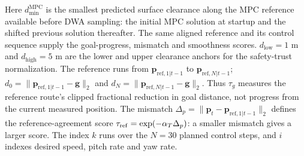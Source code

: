 \documentclass[10pt]{article}
\begin{document}
Here $d_{\min}^{\mathrm{MPC}}$ is the smallest predicted surface clearance along the MPC reference available before DWA sampling: the initial MPC solution at startup and the shifted previous solution thereafter. The same aligned reference and its control sequence supply the goal-progress, mismatch and smoothness scores. $d_{\mathrm{low}}=1$ m and $d_{\mathrm{high}}=5$ m are the lower and upper clearance anchors for the safety-trust normalization. The reference runs from $\mathbf p_{\mathrm{ref},1|t-1}$ to $\mathbf p_{\mathrm{ref},N|t-1}$; $d_0=\|\mathbf p_{\mathrm{ref},1|t-1}-\mathbf g\|_2$ and $d_N=\|\mathbf p_{\mathrm{ref},N|t-1}-\mathbf g\|_2$. Thus $\tau_g$ measures the reference route's clipped fractional reduction in goal distance, not progress from the current measured position. The mismatch $\Delta_p=\|\mathbf p_t-\mathbf p_{\mathrm{ref},1|t-1}\|_2$ defines the reference-agreement score $\tau_{\rm ref}=\exp(-\alpha_T\Delta_p)$: a smaller mismatch gives a larger score. The index $k$ runs over the $N=30$ planned control steps, and $i$ indexes desired speed, pitch rate and yaw rate.
\end{document}
